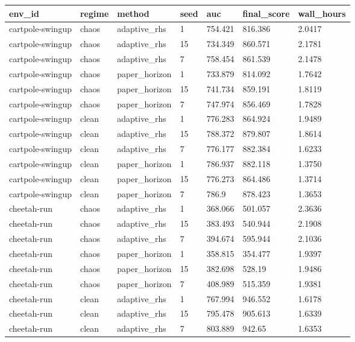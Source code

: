 \begin{tabular}{lllllll}
\toprule
env\_id & regime & method & seed & auc & final\_score & wall\_hours \\
\midrule
cartpole-swingup & chaos & adaptive\_rhs & 1 & 754.421 & 816.386 & 2.0417 \\
cartpole-swingup & chaos & adaptive\_rhs & 15 & 734.349 & 860.571 & 2.1781 \\
cartpole-swingup & chaos & adaptive\_rhs & 7 & 758.454 & 861.539 & 2.1478 \\
cartpole-swingup & chaos & paper\_horizon & 1 & 733.879 & 814.092 & 1.7642 \\
cartpole-swingup & chaos & paper\_horizon & 15 & 741.734 & 859.191 & 1.8119 \\
cartpole-swingup & chaos & paper\_horizon & 7 & 747.974 & 856.469 & 1.7828 \\
cartpole-swingup & clean & adaptive\_rhs & 1 & 776.283 & 864.924 & 1.9489 \\
cartpole-swingup & clean & adaptive\_rhs & 15 & 788.372 & 879.807 & 1.8614 \\
cartpole-swingup & clean & adaptive\_rhs & 7 & 776.177 & 882.384 & 1.6233 \\
cartpole-swingup & clean & paper\_horizon & 1 & 786.937 & 882.118 & 1.3750 \\
cartpole-swingup & clean & paper\_horizon & 15 & 776.273 & 864.486 & 1.3714 \\
cartpole-swingup & clean & paper\_horizon & 7 & 786.9 & 878.423 & 1.3653 \\
cheetah-run & chaos & adaptive\_rhs & 1 & 368.066 & 501.057 & 2.3636 \\
cheetah-run & chaos & adaptive\_rhs & 15 & 383.493 & 540.944 & 2.1908 \\
cheetah-run & chaos & adaptive\_rhs & 7 & 394.674 & 595.944 & 2.1036 \\
cheetah-run & chaos & paper\_horizon & 1 & 358.815 & 354.477 & 1.9397 \\
cheetah-run & chaos & paper\_horizon & 15 & 382.698 & 528.19 & 1.9486 \\
cheetah-run & chaos & paper\_horizon & 7 & 408.989 & 515.359 & 1.9381 \\
cheetah-run & clean & adaptive\_rhs & 1 & 767.994 & 946.552 & 1.6178 \\
cheetah-run & clean & adaptive\_rhs & 15 & 795.478 & 905.613 & 1.6339 \\
cheetah-run & clean & adaptive\_rhs & 7 & 803.889 & 942.65 & 1.6353 \\

\end{tabular}
